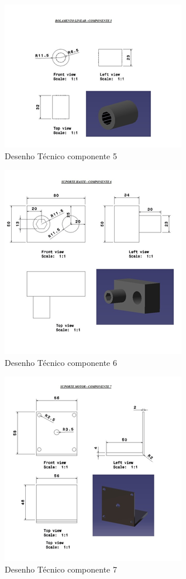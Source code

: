 \begin{apendicesenv}
\begin{figure}[H]
		\centering
			\includegraphics[scale=1.0]{figuras/tec5.png}
		\caption{Desenho Técnico componente 5}
		\label{tec5}
\end{figure}

\begin{figure}[H]
		\centering
			\includegraphics[scale=1.0]{figuras/tec6.png}
		\caption{Desenho Técnico componente 6}
		\label{tec6}
\end{figure}

\begin{figure}[H]
		\centering
			\includegraphics[scale=1.0]{figuras/tec7.png}
		\caption{Desenho Técnico componente 7}
		\label{tec7}
\end{figure}


\end{apendicesenv}
